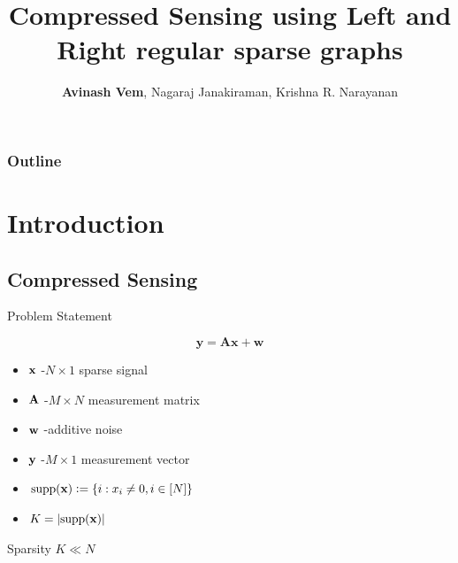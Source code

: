 \documentclass[10pt]{beamer}
\begin{document}
\title{\bf Compressed Sensing using Left and Right regular sparse graphs}
\author{\textbf{Avinash Vem}, Nagaraj Janakiraman, Krishna R. Narayanan} 
\vspace{10pt}


\date{} %
\frame{\titlepage}

\begin{frame}
	\frametitle{Outline}
	\tableofcontents
\end{frame}

\section{Introduction}
\subsection{Compressed Sensing}
\begin{frame}{Problem Statement}
\begin{block}{}
\begin{equation*}
\mathbf{y=Ax +w}
\end{equation*}
\end{block}

\begin{itemize}
\item $\mathbf{x}$ -$N \times 1$ sparse signal
\item $\mathbf{A}$ -$M \times N$ measurement matrix
\item $\mathbf{w}$ -additive noise
\item $\mathbf{y}$ -$M \times 1$ measurement vector
\item $\text{supp}(\mathbf{x})\mathrel{\mathop:}= \{i: x_i\neq 0, i\in [N]\}$
\item $K=\lvert{\text{supp}(\mathbf{x})}\rvert$
\end{itemize}

\begin{block}{Sparsity}
 $K\ll N$ 
\end{block}
\end{frame}
\end{document}
